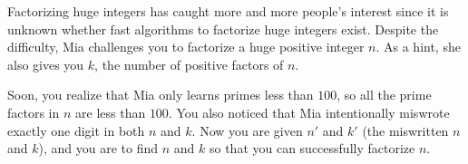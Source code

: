 Factorizing huge integers has caught more and more people's interest since it is unknown whether fast algorithms to factorize huge integers exist.
Despite the difficulty, Mia challenges you to factorize a huge positive integer $n$.
As a hint, she also gives you $k$, the number of positive factors of $n$.

Soon, you realize that Mia only learns primes less than $100$, so all the prime factors in $n$ are less than $100$.
You also noticed that Mia intentionally miswrote exactly one digit in both $n$ and $k$.
Now you are given $n'$ and $k'$ (the miswritten $n$ and $k$), and you are to find $n$ and $k$ so that you can successfully factorize $n$.